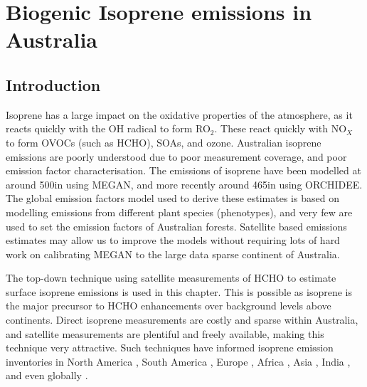 
%
%



\chapter{Biogenic Isoprene emissions in Australia} %
\label{BioIsop}
  
\section{Introduction}  
\label{BioIsop:intro}  
  
  
  
  Isoprene has a large impact on the oxidative properties of the atmosphere, as it reacts quickly with the OH radical to form RO$_2$.
  These react quickly with NO$_X$ to form OVOCs (such as HCHO), SOAs, and ozone.
  Australian isoprene emissions are poorly understood due to poor measurement coverage, and poor emission factor characterisation.
  The emissions of isoprene have been modelled at around 500\tgcpyr in \textcite{Guenther1995,Guenther2006} using MEGAN, and more recently around 465\tgcpyr in \textcite{Messina2016} using ORCHIDEE.
  The global emission factors model used to derive these estimates is based on modelling emissions from different plant species (phenotypes), and very few are used to set the emission factors of Australian forests.
  Satellite based emissions estimates may allow us to improve the models without requiring lots of hard work on calibrating MEGAN to the large data sparse continent of Australia.
  
  
  The top-down technique using satellite measurements of HCHO to estimate surface isoprene emissions is used in this chapter.
  This is possible as isoprene is the major precursor to HCHO enhancements over background levels above continents.
  Direct isoprene measurements are costly and sparse within Australia, and satellite measurements are plentiful and freely available, making this technique very attractive.
  Such techniques have informed isoprene emission inventories in North America \parencite{Abbot2003,Palmer2003,Palmer2006,Millet2006,Millet2008}, South America \parencite{Barkley2013}, Europe \parencite{Dufour2009,Curci2010}, Africa \parencite{Marais2012}, Asia \parencite{Fu2007,Stavrakou2014}, India \parencite{Surl2018}, and even globally \parencite{Shim2005,FortemsCheiney2012,Bauwens2016}.
  
